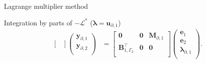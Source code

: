 \documentclass[aspectratio=169]{ISAE-Beamer}
\begin{document}
\begin{frame}{Lagrange multiplier method}
{\begin{block}{Integration by parts of $-\mathcal{L}^*$ ($\bm\lambda=\bm{u}_{\partial, 1}$) }
\begin{equation*}
\begin{aligned}
\begin{bmatrix}
\end{bmatrix}
\begin{pmatrix}
\mathbf{y}_{\partial, 1} \\
\mathbf{y}_{\partial, 2} \\
\end{pmatrix}
&= \begin{bmatrix}
\mathbf{0} & \mathbf{0} & \mathbf{M}_{\partial, 1} \\
\mathbf{B}_{1, \Gamma_2}^\top & \mathbf{0} & \mathbf{0} \\
\end{bmatrix}\begin{pmatrix}
\mathbf{e}_{1} \\
\mathbf{e}_{2} \\
{\bm{\lambda}}_{\partial, 1} \\
\end{pmatrix}.
\end{aligned}
\end{equation*}
\end{block}
}



\end{frame}
\end{document}
